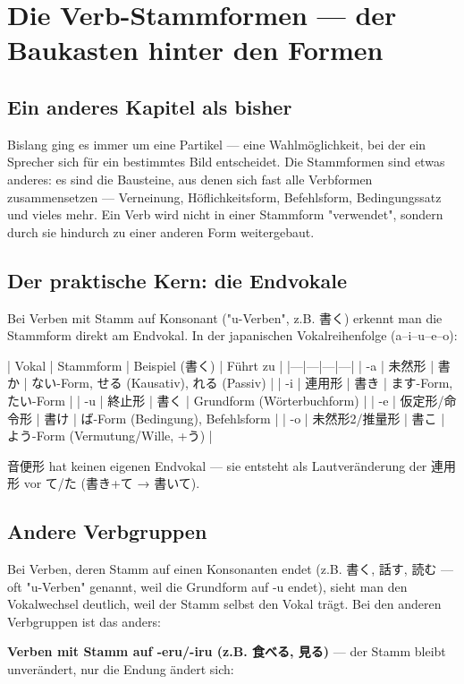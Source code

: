 \documentclass[12pt]{book}
\begin{document}
\chapter{Die Verb-Stammformen — der Baukasten hinter den Formen}

\section*{Ein anderes Kapitel als bisher}

Bislang ging es immer um eine Partikel — eine Wahlmöglichkeit, bei der ein Sprecher sich für ein bestimmtes Bild entscheidet. Die Stammformen sind etwas anderes: es sind die Bausteine, aus denen sich fast alle Verbformen zusammensetzen — Verneinung, Höflichkeitsform, Befehlsform, Bedingungssatz und vieles mehr. Ein Verb wird nicht in einer Stammform "verwendet", sondern durch sie hindurch zu einer anderen Form weitergebaut.

\section*{Der praktische Kern: die Endvokale}

Bei Verben mit Stamm auf Konsonant ("u-Verben", z.B. 書く) erkennt man die Stammform direkt am Endvokal. In der japanischen Vokalreihenfolge (a–i–u–e–o):

| Vokal | Stammform | Beispiel (書く) | Führt zu |
|---|---|---|---|
| -a | 未然形 | 書か | ない-Form, せる (Kausativ), れる (Passiv) |
| -i | 連用形 | 書き | ます-Form, たい-Form |
| -u | 終止形 | 書く | Grundform (Wörterbuchform) |
| -e | 仮定形/命令形 | 書け | ば-Form (Bedingung), Befehlsform |
| -o | 未然形2/推量形 | 書こ | よう-Form (Vermutung/Wille, +う) |

音便形 hat keinen eigenen Endvokal — sie entsteht als Lautveränderung der 連用形 vor て/た (書き+て → 書いて).

\section*{Andere Verbgruppen}

Bei Verben, deren Stamm auf einen Konsonanten endet (z.B. 書く, 話す, 読む — oft "u-Verben" genannt, weil die Grundform auf -u endet), sieht man den Vokalwechsel deutlich, weil der Stamm selbst den Vokal trägt. Bei den anderen Verbgruppen ist das anders:

\textbf{Verben mit Stamm auf -eru/-iru (z.B. 食べる, 見る)} — der Stamm bleibt unverändert, nur die Endung ändert sich:
\end{document}

